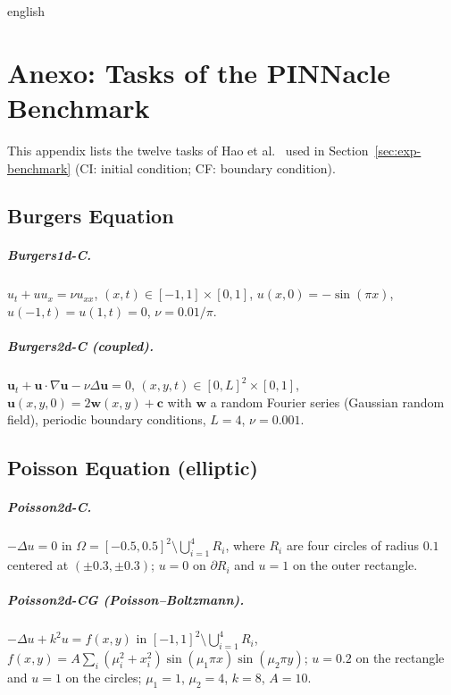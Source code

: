 \documentclass[../0000.tex]{subfiles}
\begin{document}

\begin{hyphenrules}{english}

\chapter{Anexo: Tasks of the PINNacle Benchmark}\label{app:benchmark}

This appendix lists the twelve tasks of Hao et al.~\cite{hao2024pinnacle} used in Section~\ref{sec:exp-benchmark}
(CI: initial condition; CF: boundary condition).

\section{Burgers Equation}
\paragraph{Burgers1d-C.} $u_t+uu_x=\nu u_{xx}$, $(x,t)\in[-1,1]\times[0,1]$, $u(x,0)=-\sin(\pi x)$,
$u(-1,t)=u(1,t)=0$, $\nu=0.01/\pi$.

\paragraph{Burgers2d-C (coupled).} $\mathbf{u}_t+\mathbf{u}\cdot\nabla\mathbf{u}-\nu\Delta\mathbf{u}=0$,
$(x,y,t)\in[0,L]^2\times[0,1]$, $\mathbf{u}(x,y,0)=2\mathbf{w}(x,y)+\mathbf{c}$ with $\mathbf{w}$ a random
Fourier series (Gaussian random field), periodic boundary conditions, $L=4$, $\nu=0.001$.

\section{Poisson Equation (elliptic)}
\paragraph{Poisson2d-C.} $-\Delta u=0$ in $\Omega=[-0.5,0.5]^2\setminus\bigcup_{i=1}^{4}R_i$, where $R_i$
are four circles of radius $0.1$ centered at $(\pm0.3,\pm0.3)$; $u=0$ on $\partial R_i$ and $u=1$ on the
outer rectangle.

\paragraph{Poisson2d-CG (Poisson--Boltzmann).} $-\Delta u+k^2u=f(x,y)$ in
$[-1,1]^2\setminus\bigcup_{i=1}^{4}R_i$, $f(x,y)=A\sum_i(\mu_i^2+x_i^2)\sin(\mu_1\pi x)\sin(\mu_2\pi y)$;
$u=0.2$ on the rectangle and $u=1$ on the circles; $\mu_1=1$, $\mu_2=4$, $k=8$, $A=10$.


\end{hyphenrules}
\end{document}
